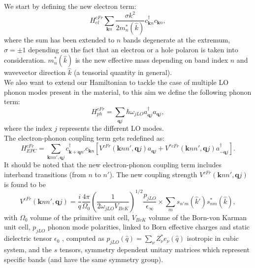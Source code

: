 We start by defining the new electron term:
\begin{equation}
    H^{cFr}_{el}\sum_{\mathbf{k}n}\frac{\sigma k^2}{2m^*_n(\hat{k})}c^\dagger_{\mathbf{k}n}c_{\mathbf{k}n},
    \label{cubic_froehlich_electron}
\end{equation}
where the sum has been extended to $n$ bands degenerate at the extremum, $\sigma=\pm 1$ depending on the fact that an electron or a hole 
polaron is taken into consideration. $m_n^*(\hat{k})$ is the new effective mass depending on band index $n$ and wavevector direction 
$\hat{k}$ (a tensorial quantity in general).\\
We also want to extend our Hamiltonian to tackle the case of multiple LO phonon modes present in the material, to this aim we define the 
following phonon term:
\begin{equation}
    H^{cFr}_{ph}=\sum_{\mathbf{q}j}\hbar\omega_{jLO}a^\dagger_{\mathbf{q}j}a_{\mathbf{q}j},
    \label{cubic_froehlich_phonon}
\end{equation}
where the index $j$ represents the different LO modes.\\
The electron-phonon coupling term gets redefined as:
\begin{equation}
    H^{cFr}_{EPC}=\sum_{\mathbf{k}nn',\mathbf{q}j}c^\dagger_{\mathbf{k}+\mathbf{q}n'}c_{\mathbf{k}n}\left[V^{cFr}(\mathbf{k}nn',\mathbf{q}j)a_{\mathbf{q}j}+V^{*cFr}(\mathbf{k}nn',\mathbf{q}j)a^\dagger_{-\mathbf{q}j}\right].
\end{equation}
It should be noted that the new electron-phonon coupling term includes interband transitions (from $n$ to $n'$). The new coupling strength 
$V^{cFr}(\mathbf{k}nn',\mathbf{q}j)$ is found to be
\begin{equation}
    V^{cFr}(\mathbf{k}nn',\mathbf{q}j)=\frac{i}{q}\frac{4\pi}{\Omega_0}\left(\frac{1}{2\omega_{jLO}V_{BvK}}\right)^{1/2}\frac{p_{jLO}}{\epsilon_\infty}\times \sum_{m}s_{n'm}(\hat{k}')s^*_{nm}(\hat{k}),
\end{equation}
with $\Omega_0$ volume of the primitive unit cell, $V_{BvK}$ volume of the Born-von Karman unit cell, $p_{jLO}$ phonon mode polarities, linked to Born 
effective charges and static dielectric tensor $\epsilon_0$ \cite{gonze1997dynamical}, computed as $p_{jLO}(\hat{q})=\sum_\nu Z^*_\nu e_\nu(\hat{q})$ isotropic in cubic 
system, and the $s$ tensors, symmetry dependent unitary matrices which represent specific bands (and have the same symmetry group).
